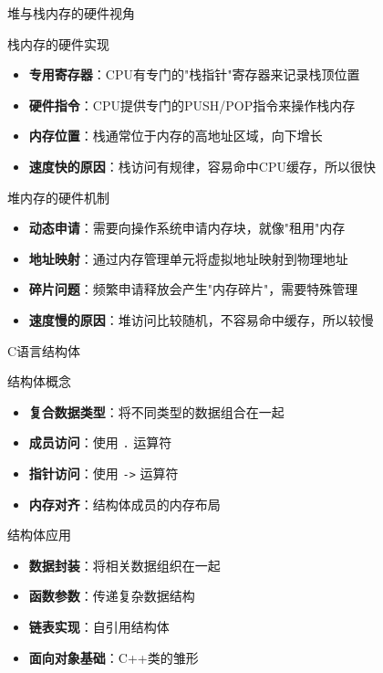 \documentclass[UTF8,aspectratio=169]{beamer}
\begin{document}
\begin{frame}{堆与栈内存的硬件视角}
    \begin{ytublock}{栈内存的硬件实现}
        \begin{itemize}
            \item \textbf{专用寄存器}：CPU有专门的"栈指针"寄存器来记录栈顶位置
            \item \textbf{硬件指令}：CPU提供专门的PUSH/POP指令来操作栈内存
            \item \textbf{内存位置}：栈通常位于内存的高地址区域，向下增长
            \item \textbf{速度快的原因}：栈访问有规律，容易命中CPU缓存，所以很快
        \end{itemize}
    \end{ytublock}
    \begin{ytublock}{堆内存的硬件机制}
        \begin{itemize}
            \item \textbf{动态申请}：需要向操作系统申请内存块，就像"租用"内存
            \item \textbf{地址映射}：通过内存管理单元将虚拟地址映射到物理地址
            \item \textbf{碎片问题}：频繁申请释放会产生"内存碎片"，需要特殊管理
            \item \textbf{速度慢的原因}：堆访问比较随机，不容易命中缓存，所以较慢
        \end{itemize}
    \end{ytublock}
\end{frame}

\begin{frame}{C语言结构体}
    \begin{ytublock}{结构体概念}
        \begin{itemize}
            \item \textbf{复合数据类型}：将不同类型的数据组合在一起
            \item \textbf{成员访问}：使用 \texttt{.} 运算符
            \item \textbf{指针访问}：使用 \texttt{->} 运算符
            \item \textbf{内存对齐}：结构体成员的内存布局
        \end{itemize}
    \end{ytublock}

    \begin{ytublock}{结构体应用}
        \begin{itemize}
            \item \textbf{数据封装}：将相关数据组织在一起
            \item \textbf{函数参数}：传递复杂数据结构
            \item \textbf{链表实现}：自引用结构体
            \item \textbf{面向对象基础}：C++类的雏形
        \end{itemize}
    \end{ytublock}
\end{frame}
\end{document}
